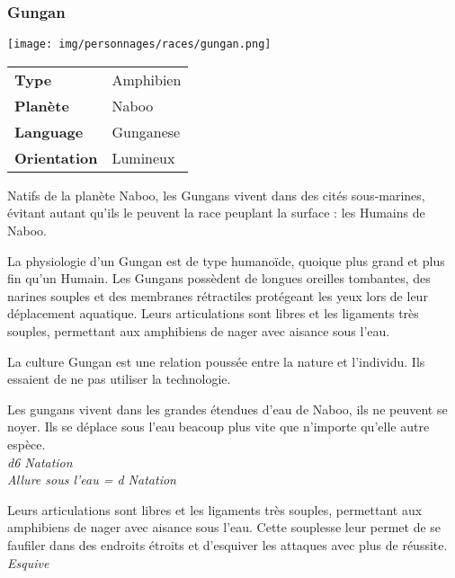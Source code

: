 \subsubsection{Gungan}
\begin{samepage}
	\vspace{-1\baselineskip}
	\texttt{[image: img/personnages/races/gungan.png]}
	\vspace{-12\baselineskip}

	\begin{flushright}
		\begin{tabular}{ l l }
			\textbf{Type} 			& Amphibien \\
		   	\textbf{Planète} 		& Naboo \\
		   	\textbf{Language} 		& Gunganese \\
		   	\textbf{Orientation} 	& Lumineux \\
		\end{tabular}
	\end{flushright}

	\vspace{7\baselineskip}
\end{samepage}

Natifs de la planète Naboo, les Gungans vivent dans des cités sous-marines, évitant autant qu'ils le peuvent la race peuplant la surface : les Humains de Naboo. 

La physiologie d'un Gungan est de type humanoïde, quoique plus grand et plus fin qu'un Humain. Les Gungans possèdent de longues oreilles tombantes, des narines souples et des membranes rétractiles protégeant les yeux lors de leur déplacement aquatique. Leurs articulations sont libres et les ligaments très souples, permettant aux amphibiens de nager avec aisance sous l'eau.

La culture Gungan est une relation poussée entre la nature et l'individu. Ils essaient de ne pas utiliser la technologie.

\begin{description}[align=left]
\item [Aquatique] 			%
		Les gungans vivent dans les grandes étendues d'eau de Naboo, ils ne peuvent se noyer. Ils se déplace sous l'eau beacoup plus vite que n'importe qu'elle autre espèce.\\
		\emph{d6 Natation}\\
		\emph{Allure sous l'eau = d Natation}
\item [Mollusque] 			%
		Leurs articulations sont libres et les ligaments très souples, permettant aux amphibiens de nager avec aisance sous l'eau. Cette souplesse leur permet de se faufiler dans des endroits étroits et d'esquiver les attaques avec plus de réussite.\\
		\emph{Esquive}
\end{description}
